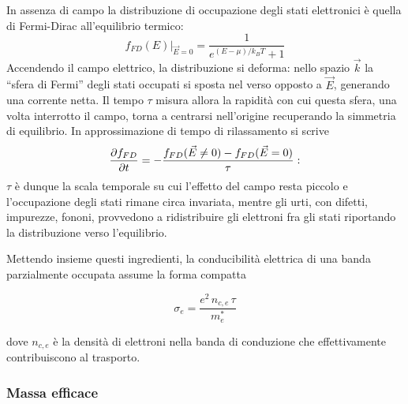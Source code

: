 In assenza di campo la distribuzione di occupazione degli stati elettronici è quella di Fermi-Dirac all'equilibrio termico:
\begin{equation}
    \left. f_{FD}(E) \right|_{\vec{E} = 0} = \frac{1}{\displaystyle e^{(E - \mu)/k_B T} + 1}
\end{equation}
Accendendo il campo elettrico, la distribuzione si deforma: nello spazio \( \vec{k} \) la ``sfera di Fermi'' degli stati occupati si sposta nel verso opposto a \( \vec{E} \), generando una corrente netta. Il tempo \( \tau \) misura allora la rapidità con cui questa sfera, una volta interrotto il campo, torna a centrarsi nell'origine recuperando la simmetria di equilibrio. In approssimazione di tempo di rilassamento si scrive
\begin{equation}
    \pdv{f_{FD}}{t} = -\frac{f_{FD}(\vec{E} \neq 0) - f_{FD}(\vec{E} = 0)}{\tau}:
\end{equation}
\( \tau \) è dunque la scala temporale su cui l'effetto del campo resta piccolo e l'occupazione degli stati rimane circa invariata, mentre gli urti, con difetti, impurezze, fononi, provvedono a ridistribuire gli elettroni fra gli stati riportando la distribuzione verso l'equilibrio.

Mettendo insieme questi ingredienti, la conducibilità elettrica di una banda parzialmente occupata assume la forma compatta
\begin{importantbox}
    \begin{equation}
        \sigma_e = \frac{e^2 \, n_{c,e} \, \tau}{m_e^*}
    \end{equation}
\end{importantbox}
dove \( n_{c,e} \) è la densità di elettroni nella banda di conduzione che effettivamente contribuiscono al trasporto.

\subsubsection{Massa efficace}

